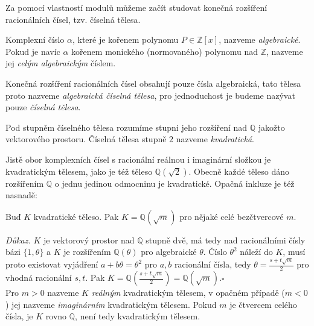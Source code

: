 \documentclass [12pt]{report}
\begin{document}
Za pomocí vlastností modulů můžeme začít studovat konečná rozšíření racionálních čísel, tzv. číselná tělesa.

\begin{definice}
Komplexní číslo $\alpha$, které je kořenem polynomu $P \in \mathbb{Z}[x]$, nazveme \textit{algebraické}. Pokud je navíc $\alpha$ kořenem monického (normovaného) polynomu nad $\mathbb{Z}$, nazveme jej \textit{celým algebraickým} číslem.
\end{definice}

\begin{definice}
Konečná rozšíření racionálních čísel obsahují pouze čísla algebraická, tato tělesa proto nazveme \textit{algebraická číselná tělesa}, pro jednoduchost je budeme nazývat pouze \textit{číselná tělesa}.
\end{definice}


\begin{definice}
Pod stupněm číselného tělesa rozumíme stupni jeho rozšíření nad $\mathbb{Q}$ jakožto vektorového prostoru. Číselná tělesa stupně $2$ nazveme \textit{kvadratická}.
\end{definice}

Jistě obor komplexních čísel s racionální reálnou i imaginární složkou je kvadratickým tělesem, jako je též těleso $\mathbb{Q}(\sqrt{2})$. Obecně každé těleso dáno rozšířením $\mathbb{Q}$ o jednu jedinou odmocninu je kvadratické. Opačná inkluze je též nasnadě:

\begin{veta}
Buď $K$ kvadratické těleso. Pak $K = \mathbb{Q}(\sqrt{m})$ pro nějaké celé bezčtvercové $m$.
\end{veta}
\noindent \textit{Důkaz.} $K$ je vektorový prostor nad $\mathbb{Q}$ stupně dvě, má tedy nad racionálními čísly bázi $\lbrace 1, \theta \rbrace$ a $K$ je rozšířením $\mathbb{Q}(\theta)$ pro algebraické $\theta$. Číslo $\theta ^2$ náleží do $K$, musí proto existovat vyjádření $a+b\theta = \theta ^2$ pro $a,b$ racionální čísla, tedy $\theta = \frac{s+t\sqrt{m}}{2}$ pro vhodná racionální $s,t$. Pak $K = \mathbb{Q}\left(\frac{s+t\sqrt{m}}{2} \right) = \mathbb{Q}(\sqrt{m})$.\hfill $\square$\\

Pro $m > 0$ nazveme $K$ \textit{reálným} kvadratickým tělesem, v opačném případě ($m < 0$) jej nazveme \textit{imaginárním} kvadratickým tělesem. Pokud $m$ je čtvercem celého čísla, je $K$ rovno $\mathbb{Q}$, není tedy kvadratickým tělesem.\\ 
\end{document}
